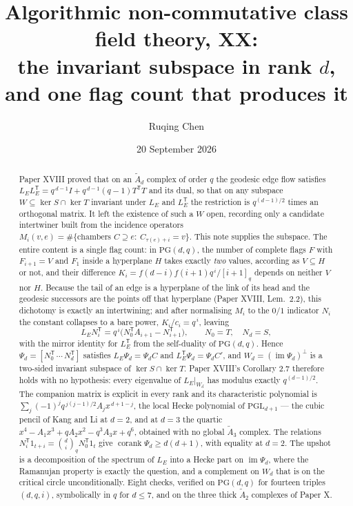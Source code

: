 \documentclass[11pt]{amsart}
\title[Algorithmic non-commutative class field theory, XX]
{Algorithmic non-commutative class field theory, XX:\\
the invariant subspace in rank $d$,\\ and one flag count that produces it}
\author{Ruqing Chen}
\date{20 September 2026}
\theoremstyle{plain}
\theoremstyle{definition}
\theoremstyle{remark}
\newcommand{\LE}{L_E}
\newcommand{\PG}{\mathrm{PG}}
\newcommand{\Atilde}[1]{\widetilde A_{#1}}
\newcommand{\im}{\operatorname{im}}
\newcommand{\tp}{\mathsf{T}}
\begin{document}
\maketitle

\begin{abstract}
\noindent
Paper XVIII proved that on an $\Atilde d$ complex of order $q$ the geodesic edge flow
satisfies $\LE\LE^{\tp}=q^{\,d-1}I+q^{\,d-1}(q-1)T^{\tp}T$ and its dual, so that on any
subspace $W\subseteq\ker S\cap\ker T$ invariant under $\LE$ and $\LE^{\tp}$ the restriction
is $q^{(d-1)/2}$ times an orthogonal matrix. It left the existence of such a $W$ open,
recording only a candidate intertwiner built from the incidence operators
$M_i(v,e)=\#\{\text{chambers } C\supseteq e:\ C_{\tau(e)+i}=v\}$. This note supplies the
subspace. The entire content is a single flag count: in $\PG(d,q)$, the number of complete
flags $F$ with $F_{i+1}=V$ and $F_1$ inside a hyperplane $H$ takes exactly \emph{two} values,
according as $V\subseteq H$ or not, and their difference
$K_i=f(d-i)f(i+1)q^{\,i}/[i+1]_q$ depends on neither $V$ nor $H$. Because the tail of an edge
is a hyperplane of the link of its head and the geodesic successors are the points off that
hyperplane (Paper XVIII, Lem.~2.2), this dichotomy is exactly an intertwining; and after
normalising $M_i$ to the $0/1$ indicator $N_i$ the constant collapses to a bare power,
$K_i/c_i=q^{\,i}$, leaving
\[
  \LE N_i^{\tp}=q^{\,i}\bigl(N_0^{\tp}A_{i+1}-N_{i+1}^{\tp}\bigr),
  \qquad N_0=T,\quad N_d=S,
\]
with the mirror identity for $\LE^{\tp}$ from the self-duality of $\PG(d,q)$. Hence
$\Psi_d=[N_0^{\tp}\,\cdots\,N_d^{\tp}]$ satisfies $\LE\Psi_d=\Psi_dC$ and
$\LE^{\tp}\Psi_d=\Psi_dC'$, and $W_d=(\im\Psi_d)^{\perp}$ is a two-sided invariant subspace
of $\ker S\cap\ker T$. Paper XVIII's Corollary 2.7 therefore holds with no hypothesis: every
eigenvalue of $\LE|_{W_d}$ has modulus exactly $q^{(d-1)/2}$. The companion matrix is
explicit in every rank and its characteristic polynomial is
$\sum_{j}(-1)^{j}q^{\,j(j-1)/2}A_jx^{\,d+1-j}$, the local Hecke polynomial of
$\mathrm{PGL}_{d+1}$ --- the cubic pencil of Kang and Li at $d=2$, and at $d=3$ the quartic
$x^4-A_1x^3+qA_2x^2-q^3A_3x+q^6$, obtained with no global $\Atilde3$ complex. The relations
$N_i^{\tp}1_{t+i}=\binom{d}{i}_{\!q}N_0^{\tp}1_t$ give $\operatorname{corank}\Psi_d\ge
d(d+1)$, with equality at $d=2$. The upshot is a decomposition of the spectrum of $\LE$ into
a Hecke part on $\im\Psi_d$, where the Ramanujan property is exactly the question, and a
complement on $W_d$ that is on the critical circle unconditionally. Eight checks, verified on
$\PG(d,q)$ for fourteen triples $(d,q,i)$, symbolically in $q$ for $d\le7$, and on the three
thick $\Atilde2$ complexes of Paper X.
\end{abstract}
\end{document}
